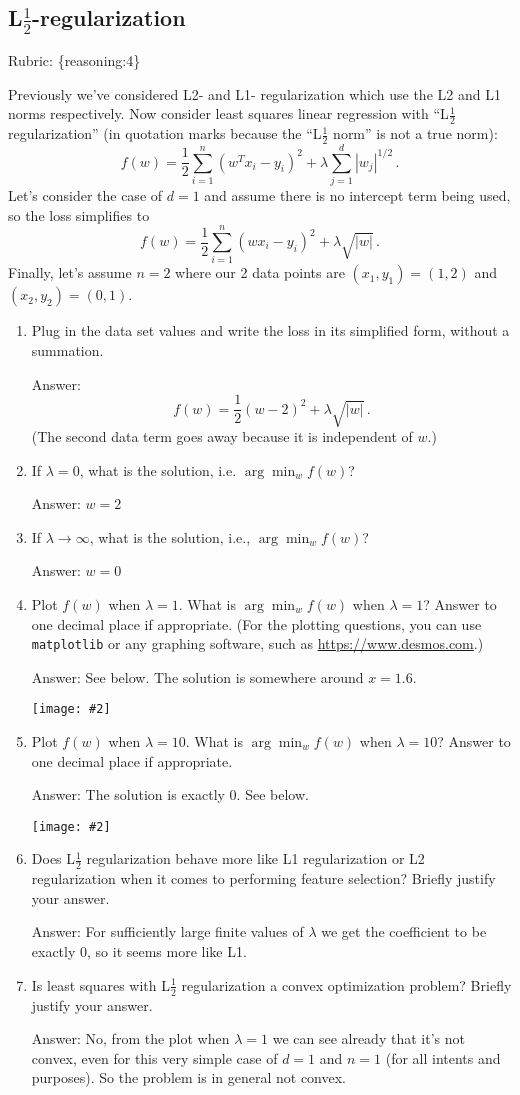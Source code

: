\documentclass{article}
\def\ans#1{\par\gre{Answer: #1}}
\def\rubric#1{\gre{Rubric: \{#1\}}}{}
\def\blu#1{{\color{blu}#1}}
\def\gre#1{{\color{gre}#1}}
\newcommand{\centerfig}[2]{\begin{center}\texttt{[image: \#2]}\end{center}}
\begin{document}
\subsection{L$\frac12$-regularization}
\rubric{reasoning:4}

Previously we've considered L2- and L1- regularization which use the L2 and L1 norms respectively. Now consider
least squares linear regression with ``L$\frac12$ regularization'' (in quotation marks because the ``L$\frac12$ norm'' is not a true norm):
\[
f(w) = \frac{1}{2} \sum_{i=1}^n (w^Tx_i - y_i)^2 + \lambda \sum_{j=1}^d |w_j|^{1/2} \, .
\]
Let's consider the case of $d=1$ and
assume  there is no intercept term being used, so the loss simplifies to
\[
f(w) = \frac{1}{2} \sum_{i=1}^n (wx_i - y_i)^2 + \lambda \sqrt{|w|} \, .
\]
Finally, let's assume $n=2$
where our 2 data points are $(x_1,y_1)=(1,2)$ and $(x_2,y_2)=(0,1)$. 

\blu{
\begin{enumerate}
\item Plug in the data set values and write the loss in its simplified form, without a summation.
\ans{\[f(w) = \frac{1}{2} (w - 2)^2  + \lambda \sqrt{|w|} \, .\]
(The second data term goes away because it is independent of $w$.)}
\item If $\lambda=0$, what is the solution, i.e. $\arg \min_w f(w)$?
\ans{$w=2$}
\item If $\lambda\rightarrow \infty$, what is the solution, i.e., $\arg \min_w f(w)$?
\ans{$w=0$}
\item Plot $f(w)$ when $\lambda = 1$. What is $\arg \min_w f(w)$ when $\lambda=1$? Answer to one decimal place if appropriate. (For the plotting questions, you can use \texttt{matplotlib} or any graphing software, such as \url{https://www.desmos.com}.)
\ans{See below. The solution is somewhere around $x=1.6$.\\
\centerfig{.33}{../figs/lambda1.png}}
\item Plot $f(w)$ when $\lambda = 10$. What is $\arg \min_w f(w)$ when $\lambda=10$? Answer to one decimal place if appropriate.
\ans{The solution is exactly 0. See below.\\
\centerfig{.33}{../figs/lambda10.png}}
\item Does L$\frac12$ regularization behave more like L1 regularization or L2 regularization
when it comes to performing feature selection? Briefly justify your answer.
\ans{For sufficiently large finite values of $\lambda$ we get the coefficient to be exactly 0, so it seems more like L1.}
\item Is least squares with L$\frac12$ regularization 
a convex optimization problem? Briefly justify your answer.
\ans{No, from the plot when $\lambda=1$ we can see already that it's not convex, even for this very simple case
of $d=1$ and $n=1$ (for all intents and purposes). So the problem is in general not convex.}
\end{enumerate}
}
\end{document}
